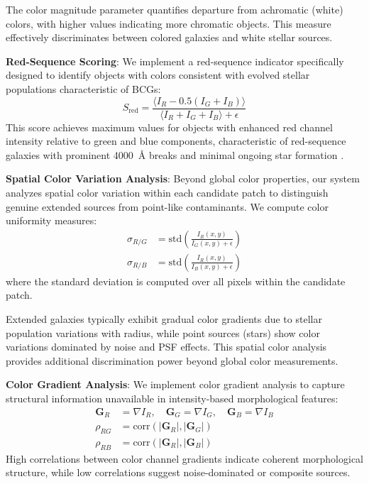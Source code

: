 \documentclass[twocolumn,10pt]{aastex631}
\begin{document}
The color magnitude parameter quantifies departure from achromatic (white) colors, with higher values indicating more chromatic objects. This measure effectively discriminates between colored galaxies and white stellar sources.

\textbf{Red-Sequence Scoring}: We implement a red-sequence indicator specifically designed to identify objects with colors consistent with evolved stellar populations characteristic of BCGs:
\begin{equation}
S_{\text{red}} = \frac{\langle I_R - 0.5(I_G + I_B) \rangle}{\langle I_R + I_G + I_B \rangle + \epsilon}
\end{equation}
This score achieves maximum values for objects with enhanced red channel intensity relative to green and blue components, characteristic of red-sequence galaxies with prominent 4000~Å breaks and minimal ongoing star formation \citep{Kodama1997,Gladders2000}.

\textbf{Spatial Color Variation Analysis}: Beyond global color properties, our system analyzes spatial color variation within each candidate patch to distinguish genuine extended sources from point-like contaminants. We compute color uniformity measures:
\begin{align}
\sigma_{R/G} &= \text{std}\left(\frac{I_R(x,y)}{I_G(x,y) + \epsilon}\right) \\
\sigma_{R/B} &= \text{std}\left(\frac{I_R(x,y)}{I_B(x,y) + \epsilon}\right)
\end{align}
where the standard deviation is computed over all pixels within the candidate patch.

Extended galaxies typically exhibit gradual color gradients due to stellar population variations with radius, while point sources (stars) show color variations dominated by noise and PSF effects. This spatial color analysis provides additional discrimination power beyond global color measurements.

\textbf{Color Gradient Analysis}: We implement color gradient analysis to capture structural information unavailable in intensity-based morphological features:
\begin{align}
\mathbf{G}_R &= \nabla I_R, \quad \mathbf{G}_G = \nabla I_G, \quad \mathbf{G}_B = \nabla I_B \\
\rho_{RG} &= \text{corr}(|\mathbf{G}_R|, |\mathbf{G}_G|) \\
\rho_{RB} &= \text{corr}(|\mathbf{G}_R|, |\mathbf{G}_B|)
\end{align}
High correlations between color channel gradients indicate coherent morphological structure, while low correlations suggest noise-dominated or composite sources.
\end{document}
